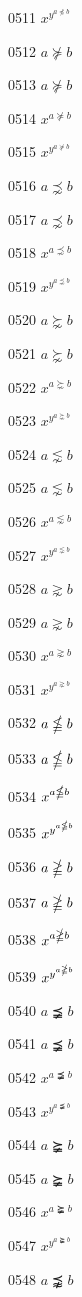 \documentclass{article}
\begin{document}
0511 $x^{y^{a\npreceq b}}$\par
0512 $a\nsucceq b$\par
0513 $\displaystyle a\nsucceq b$\par
0514 $x^{a\nsucceq b}$\par
0515 $x^{y^{a\nsucceq b}}$\par
0516 $a\precnsim b$\par
0517 $\displaystyle a\precnsim b$\par
0518 $x^{a\precnsim b}$\par
0519 $x^{y^{a\precnsim b}}$\par
0520 $a\succnsim b$\par
0521 $\displaystyle a\succnsim b$\par
0522 $x^{a\succnsim b}$\par
0523 $x^{y^{a\succnsim b}}$\par
0524 $a\lnsim b$\par
0525 $\displaystyle a\lnsim b$\par
0526 $x^{a\lnsim b}$\par
0527 $x^{y^{a\lnsim b}}$\par
0528 $a\gnsim b$\par
0529 $\displaystyle a\gnsim b$\par
0530 $x^{a\gnsim b}$\par
0531 $x^{y^{a\gnsim b}}$\par
0532 $a\nleqq b$\par
0533 $\displaystyle a\nleqq b$\par
0534 $x^{a\nleqq b}$\par
0535 $x^{y^{a\nleqq b}}$\par
0536 $a\ngeqq b$\par
0537 $\displaystyle a\ngeqq b$\par
0538 $x^{a\ngeqq b}$\par
0539 $x^{y^{a\ngeqq b}}$\par
0540 $a\precneqq b$\par
0541 $\displaystyle a\precneqq b$\par
0542 $x^{a\precneqq b}$\par
0543 $x^{y^{a\precneqq b}}$\par
0544 $a\succneqq b$\par
0545 $\displaystyle a\succneqq b$\par
0546 $x^{a\succneqq b}$\par
0547 $x^{y^{a\succneqq b}}$\par
0548 $a\precnapprox b$\par
\end{document}
